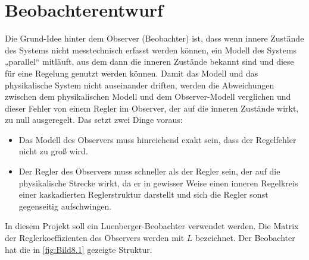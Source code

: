 \pagestyle{cyrill}
\section{Beobachterentwurf} \label{sec:beobachter}

Die Grund-Idee hinter dem Observer (Beobachter) ist, dass wenn innere Zustände des Systems nicht messtechnisch erfasst werden können, ein Modell des Systems „parallel“ mitläuft, aus dem dann die inneren Zustände bekannt sind und diese für eine Regelung genutzt werden können. Damit das Modell und das physikalische System nicht auseinander driften, werden die Abweichungen zwischen dem physikalischen Modell und dem Observer-Modell verglichen und dieser Fehler von einem Regler im Observer, der auf die inneren Zustände wirkt, zu null ausgeregelt. Das setzt zwei Dinge voraus:
\begin{itemize}
\item Das Modell des Observers muss hinreichend exakt sein, dass der Regelfehler nicht zu groß wird.
\item Der Regler des Observers muss schneller als der Regler sein, der auf die physikalische Strecke wirkt, da er in gewisser Weise einen inneren Regelkreis einer kaskadierten Reglerstruktur darstellt und sich die Regler sonst gegenseitig aufschwingen.
\end{itemize}

In diesem Projekt soll ein Luenberger-Beobachter verwendet werden. Die Matrix der Reglerkoeffizienten des Observers werden mit $L$ bezeichnet. Der Beobachter hat die in \autoref{fig:Bild8.1} gezeigte Struktur.

